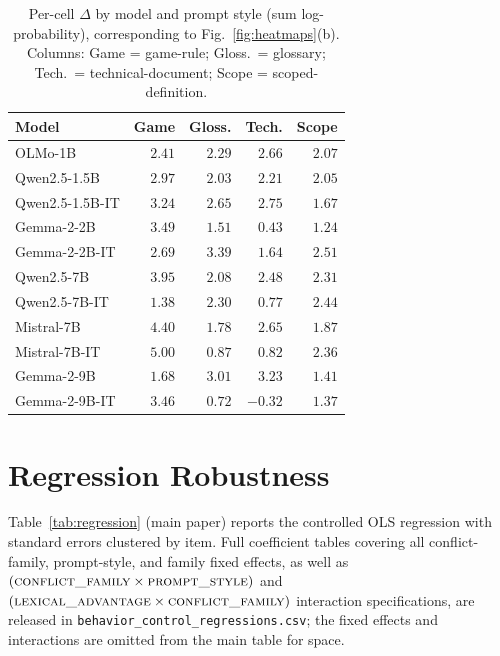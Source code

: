 \documentclass[11pt]{article}
\newcommand{\effect}{\ensuremath{\Delta}\xspace}
\begin{document}
\begin{table}[H]
\centering
\scriptsize
\setlength{\tabcolsep}{2pt}
\begin{tabular*}{\columnwidth}{@{\extracolsep{\fill}}lrrrr@{}}
\toprule
Model & Game & Gloss. & Tech. & Scope \\
\midrule
OLMo-1B           & $2.41$ & $2.29$ & $2.66$ & $2.07$ \\
Qwen2.5-1.5B      & $2.97$ & $2.03$ & $2.21$ & $2.05$ \\
Qwen2.5-1.5B-IT   & $3.24$ & $2.65$ & $2.75$ & $1.67$ \\
Gemma-2-2B        & $3.49$ & $1.51$ & $0.43$ & $1.24$ \\
Gemma-2-2B-IT     & $2.69$ & $3.39$ & $1.64$ & $2.51$ \\
Qwen2.5-7B        & $3.95$ & $2.08$ & $2.48$ & $2.31$ \\
Qwen2.5-7B-IT     & $1.38$ & $2.30$ & $0.77$ & $2.44$ \\
Mistral-7B        & $4.40$ & $1.78$ & $2.65$ & $1.87$ \\
Mistral-7B-IT     & $5.00$ & $0.87$ & $0.82$ & $2.36$ \\
Gemma-2-9B        & $1.68$ & $3.01$ & $3.23$ & $1.41$ \\
Gemma-2-9B-IT     & $3.46$ & $0.72$ & $-0.32$ & $1.37$ \\
\bottomrule
\end{tabular*}
\caption{Per-cell $\effect$ by model and prompt style (sum log-probability), corresponding to
Fig.~\ref{fig:heatmaps}(b). Columns: Game = game-rule; Gloss.\ = glossary;
Tech.\ = technical-document; Scope = scoped-definition.}
\label{tab:model_x_style}
\end{table}

\FloatBarrier
\section{Regression Robustness}
\label{app:regression}

Table~\ref{tab:regression} (main paper) reports the controlled OLS regression with standard
errors clustered by item. Full coefficient tables covering all conflict-family, prompt-style,
and family fixed effects, as well as
$(\textsc{conflict\_family} \times \textsc{prompt\_style})$ and
$(\textsc{lexical\_advantage} \times \textsc{conflict\_family})$ interaction specifications, are
released in \texttt{behavior\_control\_regressions.csv}; the fixed effects and interactions are
omitted from the main table for space.
\end{document}
